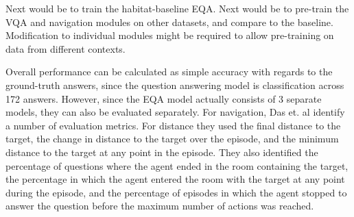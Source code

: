 \documentclass{article}
\begin{document}
Next would be to train the habitat-baseline EQA. Next would be to pre-train the VQA and navigation modules on other datasets, and compare to the baseline. Modification to individual modules might be required to allow pre-training on data from different contexts. 

Overall performance can be calculated as simple accuracy with regards to the ground-truth answers, since the question answering model is classification across 172 answers. However, since the EQA model actually consists of 3 separate models, they can also be evaluated separately. For navigation, Das et. al identify a number of evaluation metrics. For distance they used the final distance to the target, the change in distance to the target over the episode, and the minimum distance to the target at any point in the episode. They also identified the percentage of questions where the agent ended in the room containing the target, the percentage in which the agent entered the room with the target at any point during the episode, and the percentage of episodes in which the agent stopped to answer the question before the maximum number of actions was reached. 










\end{document}
